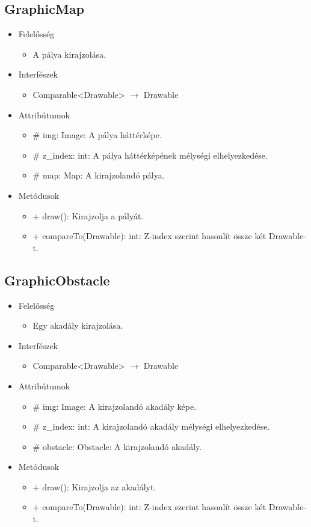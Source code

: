 \subsection{GraphicMap}
\begin{itemize}
\item Felelősség
\begin{itemize}
	\item A pálya kirajzolása.
\end{itemize}
\item Interfészek
\begin{itemize}
	\item Comparable<Drawable> $\rightarrow$ Drawable
\end{itemize}
\item Attribútumok
	\begin{itemize}
		\item \# img: Image: A pálya háttérképe.
		\item \# z\_index: int: A pálya háttérképének mélységi elhelyezkedése.
		\item \# map: Map: A kirajzolandó pálya.
	\end{itemize}
\item Metódusok
	\begin{itemize}
		\item + draw(): Kirajzolja a pályát.
		\item + compareTo(Drawable): int: Z-index szerint hasonlít össze két Drawable-t.
	\end{itemize}
\end{itemize}

\subsection{GraphicObstacle}
\begin{itemize}
\item Felelősség
\begin{itemize}
	\item Egy akadály kirajzolása.
\end{itemize}
\item Interfészek
\begin{itemize}
	\item Comparable<Drawable> $\rightarrow$ Drawable
\end{itemize}
\item Attribútumok
	\begin{itemize}
		\item \# img: Image: A kirajzolandó akadály képe.
		\item \# z\_index: int: A kirajzolandó akadály mélységi elhelyezkedése.
		\item \# obstacle: Obstacle: A kirajzolandó akadály.
	\end{itemize}
\item Metódusok
	\begin{itemize}
		\item + draw(): Kirajzolja az akadályt.
		\item + compareTo(Drawable): int: Z-index szerint hasonlít össze két Drawable-t.
	\end{itemize}
\end{itemize}

